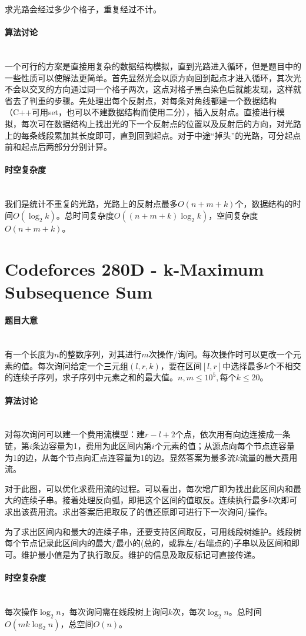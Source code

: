 \documentclass[UTF8]{ctexart}
\newcommand{\myparagraph}[1]{\paragraph{#1}\mbox{}\\}
\theoremstyle{nonumberplain}
\begin{document}
			求光路会经过多少个格子，重复经过不计。
			
		\myparagraph{算法讨论}
		
			一个可行的方案是直接用复杂的数据结构模拟，直到光路进入循环，但是题目中的一些性质可以使解法更简单。首先显然光会以原方向回到起点才进入循环，其次光不会以交叉的方向通过同一个格子两次，这点对格子黑白染色后就能发现，这样就省去了判重的步骤。先处理出每个反射点，对每条对角线都建一个数据结构（C++可用set，也可以不建数据结构而使用二分），插入反射点。直接进行模拟，每次可在数据结构上找出光的下一个反射点的位置以及反射后的方向，对光路上的每条线段累加其长度即可，直到回到起点。对于中途“掉头”的光路，可分起点前和起点后两部分分别计算。
		
		\myparagraph{时空复杂度}
		
			我们是统计不重复的光路，光路上的反射点最多$O(n+m+k)$个，数据结构的时间$O(\log_2k)$。总时间复杂度$O((n+m+k)\log_2k)$，空间复杂度$O(n+m+k)$。
	
	\section{Codeforces 280D - k-Maximum Subsequence Sum}
	
		\myparagraph{题目大意}
		
			有一个长度为$n$的整数序列，对其进行$m$次操作/询问。每次操作时可以更改一个元素的值。每次询问给定一个三元组$(l,r,k)$，要在区间$[l,r]$中选择最多$k$个不相交的连续子序列，求子序列中元素之和的最大值。$n,m \leq 10^5, \mbox{每个}k \leq 20$。
		
		\myparagraph{算法讨论}
		
			对每次询问可以建一个费用流模型：建$r-l+2$个点，依次用有向边连接成一条链，第$i$条边容量为1，费用为此区间内第$i$个元素的值；从源点向每个节点连容量为1的边，从每个节点向汇点连容量为1的边。显然答案为最多流$k$流量的最大费用流。
			
			对于此图，可以优化求费用流的过程。可以看出，每次增广即为找出此区间内和最大的连续子串。接着处理反向弧，即把这个区间的值取反。连续执行最多$k$次即可求出该费用流。求出答案后把取反了的值还原即可进行下一次询问/操作。
			
			为了求出区间内和最大的连续子串，还要支持区间取反，可用线段树维护。线段树每个节点记录此区间内的最大/最小的(总的，或靠左/右端点的)子串以及区间和即可。维护最小值是为了执行取反。维护的信息及取反标记可直接传递。
		
		\myparagraph{时空复杂度}
		
			每次操作$\log_2n$，每次询问需在线段树上询问$k$次，每次$\log_2n$。总时间$O(mk\log_2n)$，总空间$O(n)$。
	
\end{document}
